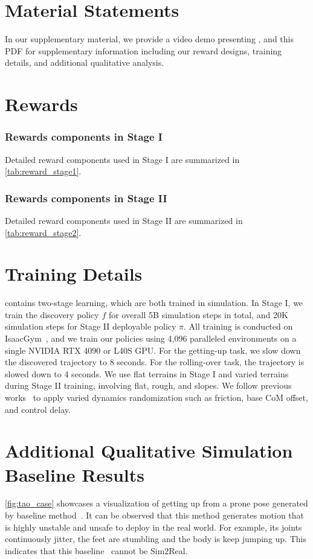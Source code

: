 \clearpage

\appendix
\section{Material Statements}
In our supplementary material, we provide a video demo presenting \ours, and this PDF for supplementary information including our reward designs, training details, and additional qualitative analysis.

\section*{Rewards}

\subsubsection{Rewards components in Stage I} 

Detailed reward components used in Stage I are summarized in \cref{tab:reward_stage1}.



\subsubsection{Rewards components in Stage II} 
Detailed reward components used in Stage II are summarized in \cref{tab:reward_stage2}.




\section*{Training Details}
\ours contains two-stage learning, which are both trained in simulation.
In Stage I, we train the discovery policy $f$ for overall 5B simulation steps in total, and 20K simulation steps for Stage II deployable policy $\pi$.
All training is conducted on IsaacGym~\cite{IsaacGym21}, and we train our policies using 4,096 paralleled environments on a single NVIDIA RTX 4090 or L40S GPU.
For the getting-up task, we slow down the discovered trajectory to 8 seconds.
For the rolling-over task, the trajectory is slowed down to 4 seconds.
We use flat terrains in Stage I and varied terrains during Stage II training, involving flat, rough, and slopes.
We follow previous works~\cite{OmniH2O24,ExtremeParkour24,HumanoidParkour24} to apply varied dynamics randomization such as friction, base CoM offset, and control delay.



\section*{Additional Qualitative Simulation Baseline Results}
\cref{fig:tao_case} showcases a visualization of getting up from a prone pose generated by baseline method~\cite{Learning2GetUp22}.
It can be observed that this method generates motion that is highly unstable and unsafe to deploy in the real world.
For example, its joints continuously jitter, the feet are stumbling and the body is keep jumping up.
This indicates that this baseline~\cite{Learning2GetUp22} cannot be Sim2Real.
